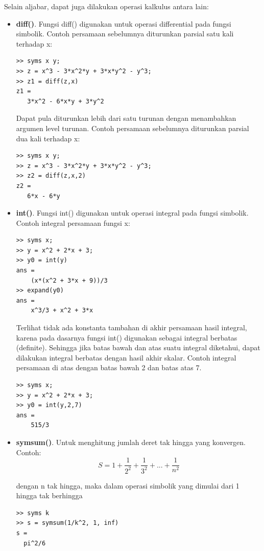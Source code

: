 \documentclass[12pt]{book}
\begin{document}
	Selain aljabar, dapat juga dilakukan operasi kalkulus antara lain:
	\begin{itemize}
		\item \textbf{diff()}. Fungsi diff() digunakan untuk operasi differential pada fungsi simbolik.
		Contoh persamaan sebelumnya diturunkan parsial satu kali terhadap x:
		\begin{verbatim}
>> syms x y;
>> z = x^3 - 3*x^2*y + 3*x*y^2 - y^3;
>> z1 = diff(z,x)
z1 =
   3*x^2 - 6*x*y + 3*y^2
		\end{verbatim}
	
		Dapat pula diturunkan lebih dari satu turunan dengan menambahkan argumen level turunan.
		Contoh persamaan sebelumnya diturunkan parsial dua kali terhadap x:
		\begin{verbatim}
>> syms x y;
>> z = x^3 - 3*x^2*y + 3*x*y^2 - y^3;
>> z2 = diff(z,x,2)
z2 =
   6*x - 6*y
		\end{verbatim}
	
		\item \textbf{int()}. Fungsi int() digunakan untuk operasi integral pada fungsi simbolik.
		Contoh integral persamaan fungsi x:
		\begin{verbatim}
>> syms x;
>> y = x^2 + 2*x + 3;
>> y0 = int(y)
ans =
    (x*(x^2 + 3*x + 9))/3
>> expand(y0)
ans =
    x^3/3 + x^2 + 3*x
		\end{verbatim}
	
		Terlihat tidak ada konstanta tambahan di akhir persamaan hasil integral, karena pada dasarnya fungsi int() digunakan sebagai integral berbatas (definite).
		Sehingga jika batas bawah dan atas suatu integral diketahui, dapat dilakukan integral berbatas dengan hasil akhir skalar.
		Contoh integral persamaan di atas dengan batas bawah 2 dan batas atas 7.
		\begin{verbatim}
>> syms x;
>> y = x^2 + 2*x + 3;
>> y0 = int(y,2,7)
ans =
    515/3
		\end{verbatim}

		\item \textbf{symsum()}. Untuk menghitung jumlah deret tak hingga yang konvergen.
		Contoh:
		\[ S = 1 + \frac{1}{2^2} + \frac{1}{3^2} + ... + \frac{1}{n^2}\]
		
		dengan n tak hingga, maka dalam operasi simbolik yang dimulai dari 1 hingga tak berhingga
		\begin{verbatim}
>> syms k
>> s = symsum(1/k^2, 1, inf)
s = 
  pi^2/6
		\end{verbatim}
	

\end{itemize}
\end{document}
